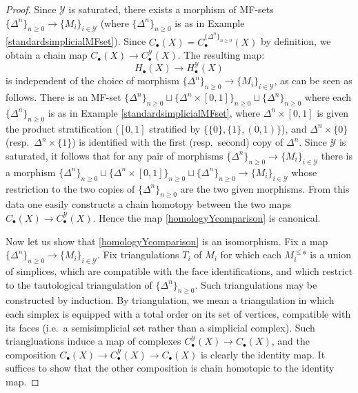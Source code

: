 \documentclass[12pt]{article}
\theoremstyle{definition}
\theoremstyle{remark}
\numberwithin{equation}{subsection}
\newcommand{\s}{\mathfrak s}
\newcommand{\Y}{\mathcal Y}
\begin{document}
\begin{proof}
Since $\Y$ is saturated, there exists a morphism of MF-sets $\{\Delta^n\}_{n\geq 0}\to\{M_i\}_{i\in\Y}$ (where $\{\Delta^n\}_{n\geq 0}$ is as in Example \ref{standardsimplicialMFset}).  Since $C_\bullet(X)=C^{\{\Delta^n\}_{n\geq 0}}_\bullet(X)$ by definition, we obtain a chain map $C_\bullet(X)\to C_\bullet^\Y(X)$.  The resulting map:
\begin{equation}\label{homologyYcomparison}
H_\bullet(X)\to H_\bullet^\Y(X)
\end{equation}
is independent of the choice of morphism $\{\Delta^n\}_{n\geq 0}\to\{M_i\}_{i\in\Y}$, as can be seen as follows.  There is an MF-set $\{\Delta^n\}_{n\geq 0}\sqcup\{\Delta^n\times[0,1]\}_{n\geq 0}\sqcup\{\Delta^n\}_{n\geq 0}$ where each $\{\Delta^n\}_{n\geq 0}$ is as in Example \ref{standardsimplicialMFset}, where $\Delta^n\times[0,1]$ is given the product stratification ($[0,1]$ stratified by $\{\{0\},\{1\},(0,1)\}$), and $\Delta^n\times\{0\}$ (resp.\ $\Delta^n\times\{1\}$) is identified with the first (resp.\ second) copy of $\Delta^n$.  Since $\Y$ is saturated, it follows that for any pair of morphisms $\{\Delta^n\}_{n\geq 0}\to\{M_i\}_{i\in\Y}$ there is a morphism $\{\Delta^n\}_{n\geq 0}\sqcup\{\Delta^n\times[0,1]\}_{n\geq 0}\sqcup\{\Delta^n\}_{n\geq 0}\to\{M_i\}_{i\in\Y}$ whose restriction to the two copies of $\{\Delta^n\}_{n\geq 0}$ are the two given morphisms.  From this data one easily constructs a chain homotopy between the two maps $C_\bullet(X)\to C_\bullet^\Y(X)$.  Hence the map \eqref{homologyYcomparison} is canonical.

Now let us show that \eqref{homologyYcomparison} is an isomorphism.  Fix a map $\{\Delta^n\}_{n\geq 0}\to\{M_i\}_{i\in\Y}$.  Fix triangulations $T_i$ of $M_i$ for which each $M_i^{\leq\s}$ is a union of simplices, which are compatible with the face identifications, and which restrict to the tautological triangulation of $\{\Delta^n\}_{n\geq 0}$.  Such triangulations may be constructed by induction.  By triangulation, we mean a triangulation in which each simplex is equipped with a total order on its set of vertices, compatible with its faces (i.e.\ a semisimplicial set rather than a simplicial complex).  Such triangluations induce a map of complexes $C_\bullet^\Y(X)\to C_\bullet(X)$, and the composition $C_\bullet(X)\to C_\bullet^\Y(X)\to C_\bullet(X)$ is clearly the identity map.  It suffices to show that the other composition is chain homotopic to the identity map.


\end{proof}
\end{document}
